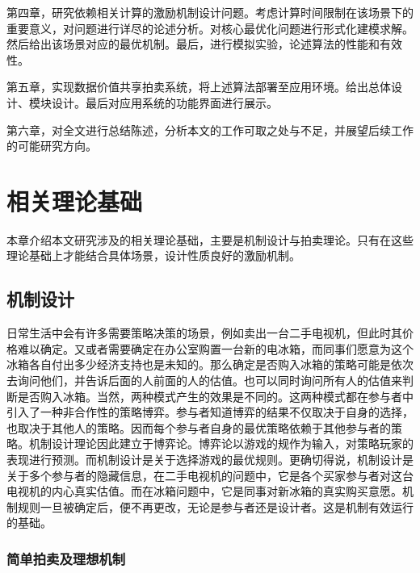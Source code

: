 \documentclass[promaster]{thesis-uestc}
\begin{document}
第四章，研究依赖相关计算的激励机制设计问题。考虑计算时间限制在该场景下的重要意义，对问题进行详尽的论述分析。对核心最优化问题进行形式化建模求解。然后给出该场景对应的最优机制。最后，进行模拟实验，论述算法的性能和有效性。

第五章，实现数据价值共享拍卖系统，将上述算法部署至应用环境。给出总体设计、模块设计。最后对应用系统的功能界面进行展示。

第六章，对全文进行总结陈述，分析本文的工作可取之处与不足，并展望后续工作的可能研究方向。



\chapter{相关理论基础}

本章介绍本文研究涉及的相关理论基础，主要是机制设计与拍卖理论。只有在这些理论基础上才能结合具体场景，设计性质良好的激励机制。

\section{机制设计}

日常生活中会有许多需要策略决策的场景，例如卖出一台二手电视机，但此时其价格难以确定。又或者需要确定在办公室购置一台新的电冰箱，而同事们愿意为这个冰箱各自付出多少经济支持也是未知的。那么确定是否购入冰箱的策略可能是依次去询问他们，并告诉后面的人前面的人的估值。也可以同时询问所有人的估值来判断是否购入冰箱。当然，两种模式产生的效果是不同的。这两种模式都在参与者中引入了一种非合作性的策略博弈。参与者知道博弈的结果不仅取决于自身的选择，也取决于其他人的策略。因而每个参与者自身的最优策略依赖于其他参与者的策略。机制设计理论因此建立于博弈论。博弈论以游戏的规作为输入，对策略玩家的表现进行预测。而机制设计是关于选择游戏的最优规则。更确切得说，机制设计是关于多个参与者的隐藏信息，在二手电视机的问题中，它是各个买家参与者对这台电视机的内心真实估值。而在冰箱问题中，它是同事对新冰箱的真实购买意愿。机制规则一旦被确定后，便不再更改，无论是参与者还是设计者。这是机制有效运行的基础。

\subsection{简单拍卖及理想机制}
\end{document}
